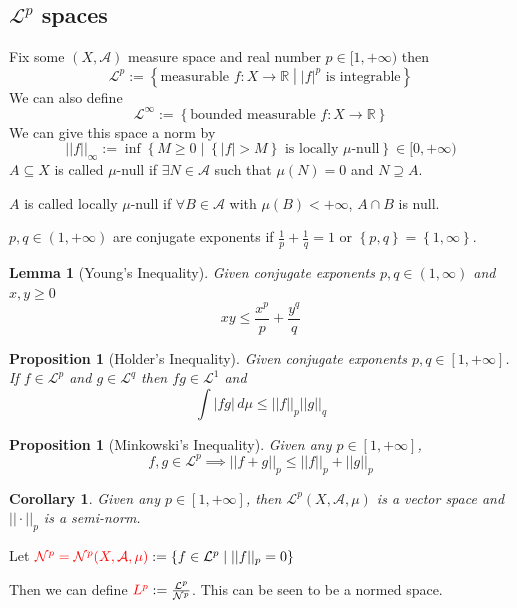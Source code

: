 \documentclass[11pt]{article}
\newcommand{\defeq}{:=}
\newcommand{\abs}[1]{|#1|}
\newcommand{\norm}[1]{||#1||}
\newcommand{\relmiddle}[1]{\mathrel{}\middle#1\mathrel{}}
\newcommand{\rmv}{\relmiddle|}
\newcommand{\dm}{\ensuremath{\,d\mu}}
\newcommand{\R}{\mathbb{R}}
\newenvironment{defin}
	{\begin{mdframed}[backgroundcolor=white, roundcorner=5pt, linewidth=1pt]}
	{\end{mdframed}}
\newcommand{\mdf}[1]{{\color{red} #1}}
\newtheorem{prop}[theorem]{Proposition}
\newtheorem{cor}[theorem]{Corollary}
\newtheorem{lemma}[theorem]{Lemma}
\begin{document}
\subsection{$\mathcal{L}^p$ spaces}
\begin{defin}
Fix some $(X, \mathcal{A})$ measure space and real number $p\in [1, +\infty)$ then
\[
	\mathcal{L}^p\defeq\left\{\text{measurable }f:X\to\R \rmv \abs{f}^p \text{ is integrable}\right\}
\]
We can also define
\[
	\mathcal{L}^\infty\defeq\left\{\text{bounded measurable }f:X\to\R\right\}
\]
We can give this space a norm by
\[
	\norm{f}_\infty \defeq \inf\left\{M\geq 0 \rmv \left\{\abs{f} > M\right\}\text{ is locally }\mu\text{-null}\right\}\in[0, +\infty)
\]
$A\subseteq X$ is called \mdf{$\mu$-null} if $\exists N \in\mathcal{A}$ such that $\mu(N)=0$ and $N\supseteq A$.

$A$ is called \mdf{locally $\mu$-null} if $\forall B \in\mathcal{A}$ with $\mu(B)< +\infty$, $A\cap B$ is null.

$p,q\in (1, +\infty)$ are \mdf{conjugate exponents} if $\frac{1}{p}+\frac{1}{q}=1$ or $\left\{p,q\right\}=\left\{1, \infty\right\}$.
\end{defin}

\begin{lemma}[Young's Inequality]
Given conjugate exponents $p,q\in (1,\infty)$ and $x,y \geq 0$
\[
	xy\leq \frac{x^p}{p}+\frac{y^q}{q}
\]
\end{lemma}

\begin{prop}[Holder's Inequality]
Given conjugate exponents $p,q\in [1, + \infty]$.
If $f\in\mathcal{L}^p$ and $g\in\mathcal{L}^q$ then $fg\in\mathcal{L}^1$ and
\[
	\int\abs{fg}\dm \leq \norm{f}_p\norm{g}_q
\]
\end{prop}

\begin{prop}[Minkowski's Inequality]
Given any $p\in[1, + \infty]$,
\[
f,g\in\mathcal{L}^p \implies \norm{f+g}_p \leq \norm{f}_p + \norm{g}_p
\]
\end{prop}

\begin{cor}
	Given any $p\in[1, +\infty]$, then $\mathcal{L}^p(X, \mathcal{A}, \mu)$ is a vector space and $\norm{\cdot}_p$ is a semi-norm.
\end{cor}

\begin{defin}
	Let $\mdf{\mathcal{N}^p=\mathcal{N}^p(X, \mathcal{A}, \mu)}\defeq\left\{f\in\mathcal{L}^p \rmv \norm{f}_p =0 \right\}$

	Then we can define $\mdf{L^p}\defeq\frac{\mathcal{L}^p}{\mathcal{N}^p}$.
	This can be seen to be a normed space.
\end{defin}
\end{document}
